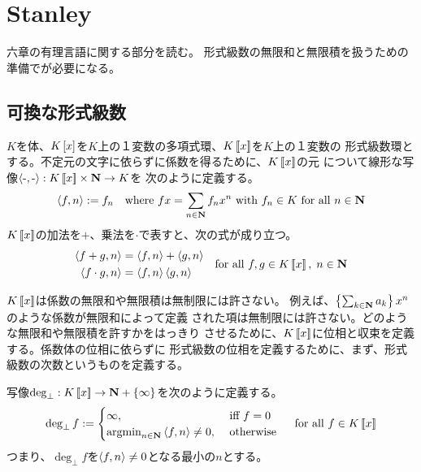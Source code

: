 \begingroup %
{\setlength\arraycolsep{2pt}
%
\section{Stanley}\label{s1:Stanley} %
	\cite{stanley-2}六章の有理言語に関する部分を読む。
	形式級数の無限和と無限積を扱うための準備で\cite{stanley-1}が必要になる。

\subsection{可換な形式級数}\label{s2:可換な形式級数} %
	$K$を体、$K\mathinner{[{x}]}$を$K$上の１変数の多項式環、$K\mathinner{[\![{x}]\!]}$を$K$上の１変数の
	形式級数環とする。不定元の文字に依らずに係数を得るために、$K\mathinner{[\![{x}]\!]}$の元
	について線形な写像$\dlr{\here,\here}:K\bblr{x}\times\sizen\to K$を
	次のように定義する。
	\begin{equation*}\begin{split}
		\mathinner{\langle{f,n}\rangle} := f_n \quad\text{where } fx = \sum_{n\in\mathbf{N}} f_nx^n
		\text{ with } f_n\in K \text{ for all } n\in\mathbf{N}
	\end{split}\end{equation*}
	$K\mathinner{[\![{x}]\!]}$の加法を$+$、乗法を$\cdot$で表すと、次の式が成り立つ。
	\begin{equation*}\begin{split}
		\mathinner{\langle{f + g, n}\rangle} &= \mathinner{\langle{f, n}\rangle} + \mathinner{\langle{g, n}\rangle} \\
		\mathinner{\langle{f \cdot g, n}\rangle} &= \mathinner{\langle{f, n}\rangle}\mathinner{\langle{g, n}\rangle} \\
	\end{split}
	\quad\text{for all } f,g\in K\mathinner{[\![{x}]\!]},\; n\in\mathbf{N}
	\end{equation*}

	$K\mathinner{[\![{x}]\!]}$は係数の無限和や無限積は無制限には許さない。
	例えば、$\mathinner{\left\{{\sum_{k\in\ensuremath{\mathbf{N}}}a_k}\right\}}x^n$のような係数が無限和によって定義
	された項は無制限には許さない。どのような無限和や無限積を許すかをはっきり
	させるために、$K\mathinner{[\![{x}]\!]}$に位相と収束を定義する。係数体の位相に依らずに
	形式級数の位相を定義するために、まず、形式級数の次数というものを定義する。

	\begin{definition}[形式級数の次数]\label{def:形式級数の次数} %
		写像$\deg_\bot:K\mathinner{[\![{x}]\!]}\to\mathbf{N}+\mathinner{\left\{{\infty}\right\}}$を次のように定義する。
		\begin{equation*}\begin{split}
			\deg_\bot f := \begin{cases}
				\infty, &\text{ iff } f = 0 \\
				\mathinner{\operatorname{argmin}}_{n\in\mathbf{N}} \mathinner{\langle{f,n}\rangle}\neq0, &\text{ otherwise } \\
			\end{cases} \quad\text{for all } f\in K\mathinner{[\![{x}]\!]}
		\end{split}\end{equation*}
		つまり、$\deg_\bot f$を$\mathinner{\langle{f,n}\rangle}\neq0$となる最小の$n$とする。\EOP
	\end{definition} %

}
